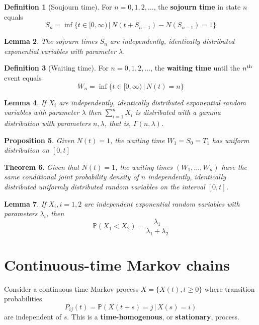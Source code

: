 \documentclass[10pt, oneside, reqno]{amsart}
\theoremstyle{plain}%
\newtheorem{thm}{Theorem}[section]
\newtheorem{lem}[thm]{Lemma}
\newtheorem{prop}[thm]{Proposition}
\theoremstyle{definition}
\newtheorem{defn}[thm]{Definition}
\theoremstyle{remark}
\newcommand{\prob}[1]{\mathbb{P}(#1)}
\newcommand{\given}{ \, | \,}
\newcommand{\nth}{n\textsuperscript{th}}
\begin{document}
\begin{defn}[Soujourn time]
    For $n = 0,1,2,\dots$, the \textbf{sojourn time} in state $n$ equals \[
        S_n = \inf \{t \in [0, \infty) \given N(t + S_{n-1}) - N(S_{n-1}) = 1 \}
    \]
\end{defn}

\begin{lem}
    The sojourn times $S_n$ are independently, identically distributed exponential variables with parameter $\lambda$.
\end{lem}

\begin{defn}[Waiting time]
    For $n = 0,1,2,\dots$, the \textbf{waiting time} until the $\nth$ event equals \[
        W_n = \inf \{ t \in [0,\infty) \given N(t) = n\}
    \]
\end{defn}

\begin{lem}
    If $X_i$ are independently, identically distributed exponential random variables with parameter $\lambda$ then $\sum_{i = 1}^n X_i$ is distributed with a gamma distribution with parameters $n, \lambda$, that is, $\Gamma(n,\lambda)$.
\end{lem}

\begin{prop}
    Given $N(t) = 1$, the waiting time $W_1 = S_0 = T_1$ has uniform distribution on $[0,t]$
\end{prop}

\begin{thm}
    Given that $N(t) = 1$, the waiting times $(W_1, \dots, W_n)$ have the same conditional joint probability density of $n$ independently, identically distributed uniformly distributed random variables on the interval $[0,t]$.
\end{thm}

\begin{lem}
    If $X_i, i = 1,2$ are independent exponential random variables with parameters $\lambda_i$, then \[
        \prob{X_1 < X_2} = \frac{\lambda_1}{\lambda_1 + \lambda_2}
    \]
\end{lem}

\section{Continuous-time Markov chains} %
\label{sub:continuous_time_markov_chains}
Consider a continuous time Markov process $X = \{X(t), t \geq 0 \}$ where transition probabilities \[
    P_{ij}(t) = \prob{X(t+s) = j \given X(s) = i}
\] are independent of $s$.  This is a \textbf{time-homogenous}, or \textbf{stationary}, process.
\end{document}
